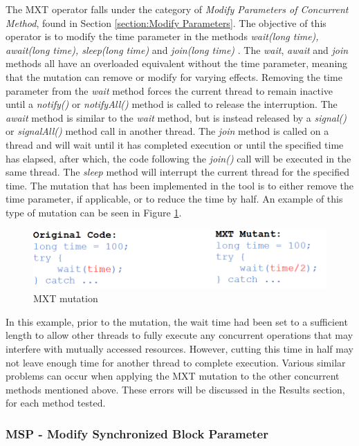 \documentclass[a4paper,12pt]{article}
\begin{document}
The MXT operator falls under the category of \textit{Modify Parameters of Concurrent Method}, found in Section \ref{section:Modify Parameters}. The objective of this operator is to modify the time parameter in the methods \textit{wait(long time), await(long time), sleep(long time)} and \textit{join(long time)} \citep{bradbury06}. The \textit{wait}, \textit{await} and \textit{join} methods all have an overloaded equivalent without the time parameter, meaning that the mutation can remove or modify for varying effects. Removing the time parameter from the \textit{wait} method forces the current thread to remain inactive until a \textit{notify()} or \textit{notifyAll()} method is called to release the interruption. The \textit{await} method is similar to the \textit{wait} method, but is instead released by a \textit{signal()} or \textit{signalAll()} method call in another thread. The \textit{join} method is called on a thread and will wait until it has completed execution or until the specified time has elapsed, after which, the code following the \textit{join()} call will be executed in the same thread. The \textit{sleep} method will interrupt the current thread for the specified time. The mutation that has been implemented in the tool is to either remove the time parameter, if applicable, or to reduce the time by half. An example of this type of mutation can be seen in Figure \ref{fig:MXT}. 

\begin{figure}[h]
    \centering
    \includegraphics[scale = 0.55]{MXT.png}
    \caption{MXT mutation \citep{bradbury06}}
    \label{fig:MXT}
\end{figure}

In this example, prior to the mutation, the wait time had been set to a sufficient length to allow other threads to fully execute any concurrent operations that may interfere with mutually accessed resources. However, cutting this time in half may not leave enough time for another thread to complete execution. Various similar problems can occur when applying the MXT mutation to the other concurrent methods mentioned above. These errors will be discussed in the Results section, for each method tested.  

\subsubsection{MSP - Modify Synchronized Block Parameter}
	
\end{document}
